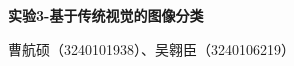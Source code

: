 \documentclass[UTF8,fontset=none,a4paper]{ctexart}
\begin{document}
{\color{ReportTeal}\bfseries\fontsize{14bp}{19bp}\selectfont 实验3-基于传统视觉的图像分类\par}
{\color{ReportInk}曹航硕（3240101938）、吴翱臣（3240106219）\par}





\end{document}
